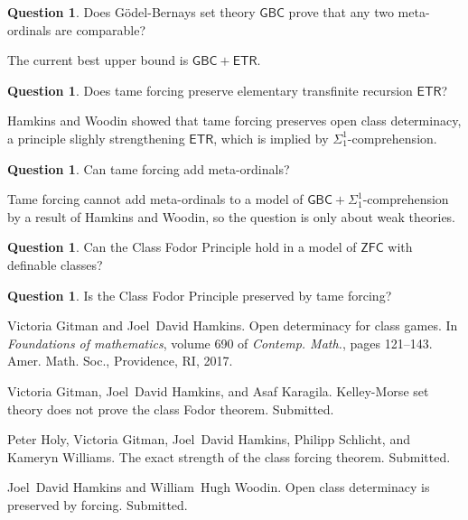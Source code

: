 \documentclass{amsart}
\theoremstyle{definition}
\newtheorem{question}[theorem]{Question}
\newcommand{\ZFC}{\mathsf{ZFC}}
\newcommand{\Godel}{G\"{o}del}
\newcommand{\GBC}{\mathsf{GBC}}
\newcommand{\ETR}{\mathsf{ETR}}
\begin{document}
\begin{question}
Does \Godel-Bernays set theory $\GBC$ prove that any two meta-ordinals are comparable?
\end{question}
The current best upper bound is $\GBC+\ETR$.
\begin{question}
Does tame forcing preserve elementary transfinite recursion $\ETR$?
\end{question}
Hamkins and Woodin showed that tame forcing preserves open class determinacy, a principle slighly strengthening $\ETR$, which is implied by $\Sigma^1_1$-comprehension. 
\begin{question}
Can tame forcing add meta-ordinals? 
\end{question}
Tame forcing cannot add meta-ordinals to a model of $\GBC+\Sigma^1_1$-comprehension by a result of Hamkins and Woodin, so the question is only about weak theories.
\begin{question}
Can the Class Fodor Principle hold in a model of $\ZFC$ with definable classes? 
\end{question}
\begin{question}
Is the Class Fodor Principle preserved by tame forcing?
\end{question}

%
%

\begin{thebibliography}{SNW19}

Victoria Gitman and Joel~David Hamkins.
\newblock Open determinacy for class games.
\newblock In {\em Foundations of mathematics}, volume 690 of {\em Contemp.
  Math.}, pages 121--143. Amer. Math. Soc., Providence, RI, 2017.

Victoria Gitman, Joel~David Hamkins, and Asaf Karagila.
\newblock Kelley-{M}orse set theory does not prove the class {F}odor theorem.
\newblock Submitted.

Peter Holy, Victoria Gitman, Joel~David Hamkins, Philipp Schlicht, and Kameryn
  Williams.
\newblock The exact strength of the class forcing theorem.
\newblock Submitted.

Joel~David Hamkins and William~Hugh Woodin.
\newblock Open class determinacy is preserved by forcing.
\newblock Submitted.

\end{thebibliography}
\end{document}
